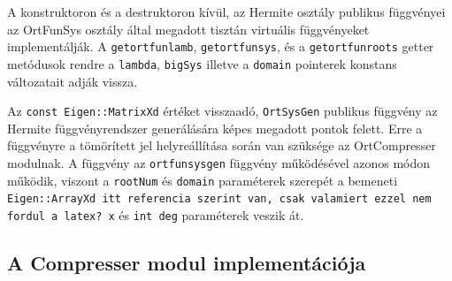 \documentclass[oneside,titlepage,12pt,a4paper]{report}
\begin{document}
\par A konstruktoron és a destruktoron kívül, az Hermite osztály publikus függvényei az OrtFunSys osztály által megadott tisztán virtuális függvényeket implementálják. A \texttt{getortfunlamb}, \texttt{getortfunsys}, és a \texttt{getortfunroots} getter metódusok rendre a \texttt{lambda}, \texttt{bigSys} illetve a \texttt{domain} pointerek konstans változatait adják vissza. 
\par Az \texttt{const Eigen::MatrixXd} értéket visszaadó, \texttt{OrtSysGen} publikus függvény az Hermite függvényrendszer generálására képes megadott pontok felett. Erre a függvényre a tömörített jel helyreállítása során van szüksége az OrtCompresser modulnak. A függvény az \texttt{ortfunsysgen} függvény működésével azonos módon működik, viszont a \texttt{rootNum} és \texttt{domain} paraméterek szerepét a bemeneti \texttt{Eigen::ArrayXd itt referencia szerint van, csak valamiert ezzel nem fordul a latex? x} és \texttt{int deg} paraméterek veszik át.   

\subsection{A Compresser modul implementációja}
\end{document}
